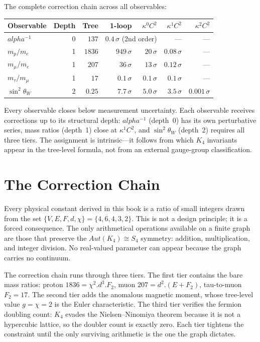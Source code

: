 \documentclass[11pt,a4paper]{book}
\def\alpha{alpha}%
\def\cdot{.}%
\def\mathrm#1{#1}%
\begin{document}
The complete correction chain across all observables:
%
\begin{center}
\begin{tabular}{lrrrrrr}
\toprule
Observable & Depth & Tree & 1-loop & $\kappa^0 C^2$ & $\kappa^1 C^2$ & $\kappa^2 C^2$ \\
\midrule
$\alpha^{-1}$ & 0 & $137$ & \multicolumn{2}{c}{$0.4\,\sigma$ (2nd order)} & --- & --- \\
$m_p / m_e$ & 1 & $1836$ & $949\,\sigma$ & $20\,\sigma$ & $0.08\,\sigma$ & --- \\
$m_\mu / m_e$ & 1 & $207$ & $36\,\sigma$ & $13\,\sigma$ & $0.12\,\sigma$ & --- \\
$m_\tau / m_\mu$ & 1 & $17$ & $0.1\,\sigma$ & $0.1\,\sigma$ & $0.1\,\sigma$ & --- \\
$\sin^2\!\theta_W$ & 2 & $0.25$ & $7.7\,\sigma$ & $5.0\,\sigma$ & $3.5\,\sigma$ & $0.001\,\sigma$ \\
\bottomrule
\end{tabular}
\end{center}
%
Every observable closes below measurement uncertainty.  Each observable
receives corrections up to its structural depth: $\alpha^{-1}$
(depth~0) has its own perturbative series, mass ratios (depth~1)
close at $\kappa^1 C^2$, and $\sin^2\!\theta_W$ (depth~2) requires
all three tiers.  The assignment is intrinsic---it follows from
which $K_4$ invariants appear in the tree-level formula, not from
an external gauge-group classification.

\chapter{The Correction Chain}
\label{ch:correction-chain}

Every physical constant derived in this book is a ratio of small integers
drawn from the set $\{V, E, F, d, \chi\} = \{4, 6, 4, 3, 2\}$.  This is
not a design principle; it is a forced consequence.  The only arithmetical
operations available on a finite graph are those that preserve the
$\mathrm{Aut}(K_4) \cong S_4$ symmetry: addition, multiplication, and
integer division.  No real-valued parameter can appear because the graph
carries no continuum.

The correction chain runs through three tiers.  The first tier contains
the bare mass ratios: proton $1836 = \chi^2 \cdot d^3 \cdot F_2$,
muon $207 = d^2 \cdot (E + F_2)$, tau-to-muon $F_2 = 17$.  The second
tier adds the anomalous magnetic moment, whose tree-level value
$g = \chi = 2$ is the Euler characteristic.  The third tier verifies
the fermion doubling count: $K_4$ evades the Nielsen--Ninomiya theorem
because it is not a hypercubic lattice, so the doubler count is exactly
zero.  Each tier tightens the constraint until the only surviving
arithmetic is the one the graph dictates.
\end{document}
